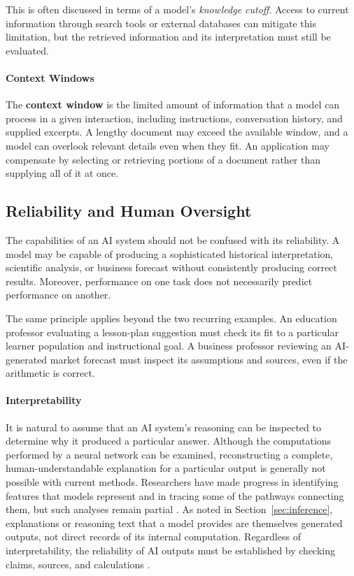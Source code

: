 \documentclass[11pt]{article}
\begin{document}
This is often discussed in terms of a model's
\emph{knowledge cutoff}. Access to current information
through search tools or external databases can mitigate
this limitation, but the retrieved information and its
interpretation must still be evaluated.

\paragraph{Context Windows}
The \textbf{context window} is the limited amount of information
that a model can process in a given interaction, including instructions,
conversation history, and supplied excerpts. A lengthy document may
exceed the available window, and a model can overlook relevant details
even when they fit. An application may compensate by selecting or
retrieving portions of a document rather than supplying all of it at once.

\subsection{Reliability and Human Oversight}

The capabilities of an AI system should not be confused
with its reliability. A model may be capable of producing
a sophisticated historical interpretation, scientific
analysis, or business forecast without consistently
producing correct results. Moreover, performance on
one task does not necessarily predict performance on
another.

The same principle applies beyond the two recurring examples.
An education professor evaluating a lesson-plan suggestion must check
its fit to a particular learner population and instructional goal.
A business professor reviewing an AI-generated market forecast must
inspect its assumptions and sources, even if the arithmetic is correct.

\paragraph{Interpretability}
It is natural to assume that an AI system's reasoning can be
inspected to determine why it produced a particular answer.
Although the computations performed by a neural network can be
examined, reconstructing a complete, human-understandable
explanation for a particular output is generally not possible
with current methods. Researchers have made progress in
identifying features that models represent and in tracing some
of the pathways connecting them, but such analyses remain
partial \citep{Lindsey2025Biology}. As noted in
Section~\ref{sec:inference}, explanations or reasoning text that
a model provides are themselves generated outputs, not direct
records of its internal computation. Regardless of
interpretability, the reliability of AI outputs must be
established by checking claims, sources, and calculations
\citep{NIST2023AIRMF}.
\end{document}
